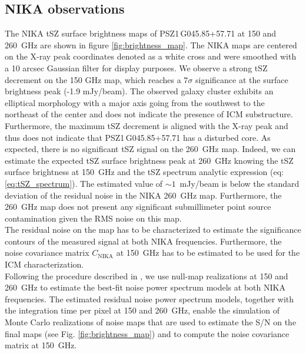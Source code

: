 \documentclass[traditabstract]{aa}
\begin{document}
\subsection{NIKA observations}\label{sec:Raw_NIKA_observations}
The NIKA tSZ surface brightness maps of \mbox{PSZ1\,G045.85+57.71} at 150 and 260~GHz are shown in figure \ref{fig:brightness_map}. The NIKA maps are centered on the X-ray peak coordinates denoted as a white cross and were smoothed with a 10 arcsec Gaussian filter for display purposes. We observe a strong tSZ decrement on the 150 GHz map, which reaches a $7\sigma$ significance at the surface brightness peak (-1.9 mJy/beam). The observed galaxy cluster exhibits an elliptical morphology with a major axis going from the southwest to the northeast of the center and does not indicate the presence of ICM substructure. Furthermore, the maximum tSZ decrement is aligned with the X-ray peak and thus does not indicate that \mbox{PSZ1\,G045.85+57.71} has a disturbed core. As expected, there is no significant tSZ signal on the 260~GHz map. Indeed, we can estimate the expected tSZ surface brightness peak at 260~GHz knowing the tSZ surface brightness at 150~GHz and the tSZ spectrum analytic expression (eq:\ref{eq:tSZ_spectrum}). The estimated value of \mbox{$\sim 1$~mJy/beam} is below the standard deviation of the residual noise in the NIKA 260~GHz map. Furthermore, the 260~GHz map does not present any significant submillimeter point source contamination given the RMS noise on this map.\\
The residual noise on the map has to be characterized to estimate the significance contours of the measured signal at both NIKA frequencies. Furthermore, the noise covariance matrix $C_{\mathrm{NIKA}}$ at 150~GHz has to be estimated to be used for the ICM characterization.\\
\indent Following the procedure described in \citealt{MACSJ1424NIKA}, we use null-map realizations at 150 and 260~GHz to estimate the best-fit noise power spectrum models at both NIKA frequencies. The estimated residual noise power spectrum models, together with the integration time per pixel at 150 and 260~GHz, enable the simulation of Monte Carlo realizations of noise maps that are used to estimate the S/N on the final maps (see Fig. \ref{fig:brightness_map}) and to compute the noise covariance matrix at 150~GHz.

\end{document}
